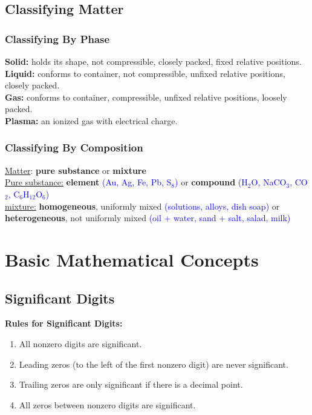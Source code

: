 \documentclass[a4paper, 12pt]{article}
\begin{document}
\subsection*{Classifying Matter}

\subsubsection*{Classifying By Phase}
\textbf{Solid:} holds its shape, not compressible, closely packed, fixed relative positions.
\\
\textbf{Liquid:} conforms to container, not compressible, unfixed relative positions, closely packed.
\\
\textbf{Gas:} conforms to container, compressible, unfixed relative positions, loosely packed.
\\
\textbf{Plasma:} an ionized gas with electrical charge. 

\subsubsection*{Classifying By Composition}
\underline{Matter}: \textbf{pure substance} or \textbf{mixture}
\\
\underline{Pure substance:} \textbf{element} \textcolor{blue}{(Au, Ag, Fe, Pb, S$_8$)} or \textbf{compound} \textcolor{blue}{(H$_2$O, NaCO$_3$, CO$_2$, C$_6$H$_{\text{12}}$O$_6$)}
\\
\underline{mixture:} \textbf{homogeneous}, uniformly mixed \textcolor{blue}{(solutions, alloys, dish soap)} or \textbf{heterogeneous}, not uniformly mixed \textcolor{blue}{(oil + water, sand + salt, salad, milk)}

\section{Basic Mathematical Concepts}

\subsection*{Significant Digits}
\textbf{Rules for Significant Digits:}
\begin{enumerate}[leftmargin=*, nosep]
    \item All nonzero digits are significant.
    \item Leading zeros (to the left of the first nonzero digit) are never significant.
    \item Trailing zeros are only significant if there is a decimal point.
    \item All zeros between nonzero digits are significant.
\end{enumerate}
\end{document}
